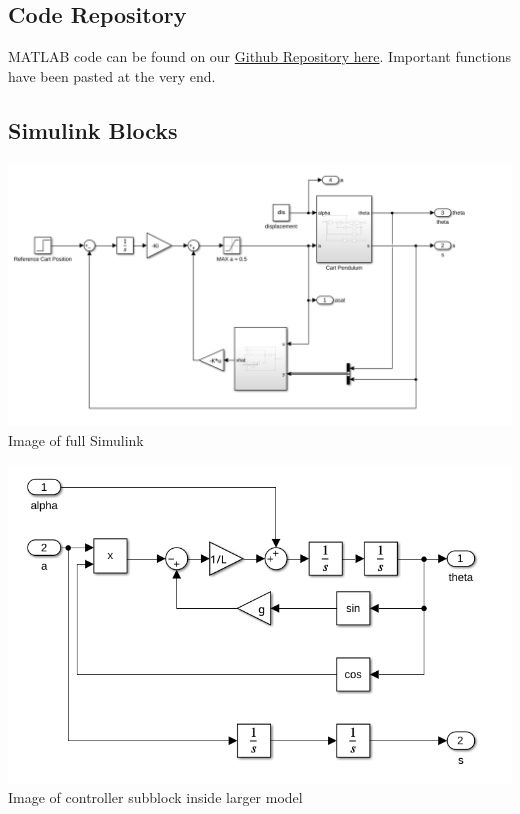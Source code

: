 \documentclass[12pt]{article}
\begin{document}
\subsection{Code Repository}

MATLAB code can be found on our \href{https://github.com/slmnemo/e102invpend}{Github Repository here}. Important functions have been pasted at the very end.

\subsection{Simulink Blocks}

\begin{center}
    \includegraphics[width=6in]{graphs/simulinkfull.png} \\
    Image of full Simulink
\end{center}

\begin{center}
    \includegraphics[width=6in]{graphs/simulinkcontroller.png} \\
    Image of controller subblock inside larger model
\end{center}
\end{document}
